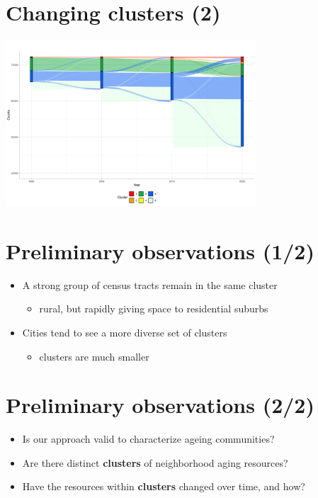 \documentclass[
  letterpaper,
  DIV=11,
  numbers=noendperiod]{scrartcl}
\providecommand{\tightlist}{%
  \setlength{\itemsep}{0pt}\setlength{\parskip}{0pt}}\usepackage{longtable,booktabs,array}
\begin{document}
\hypertarget{changing-clusters-2}{%
\section{Changing clusters (2)}\label{changing-clusters-2}}

\includegraphics[width=0.7\textwidth,height=\textheight]{imgs/sankeyB.png}

\hypertarget{preliminary-observations-12}{%
\section{Preliminary observations
(1/2)}\label{preliminary-observations-12}}

\begin{itemize}
\tightlist
\item
  A strong group of census tracts remain in the same cluster

  \begin{itemize}
  \tightlist
  \item
    rural, but rapidly giving space to residential suburbs
  \end{itemize}
\item
  Cities tend to see a more diverse set of clusters

  \begin{itemize}
  \tightlist
  \item
    clusters are much smaller
  \end{itemize}
\end{itemize}

\hypertarget{preliminary-observations-22}{%
\section{Preliminary observations
(2/2)}\label{preliminary-observations-22}}

\begin{itemize}
\tightlist
\item
  Is our approach valid to characterize ageing communities?
\item
  Are there distinct \textbf{clusters} of neighborhood aging resources?
\item
  Have the resources within \textbf{clusters} changed over time, and
  how?
\end{itemize}
\end{document}
